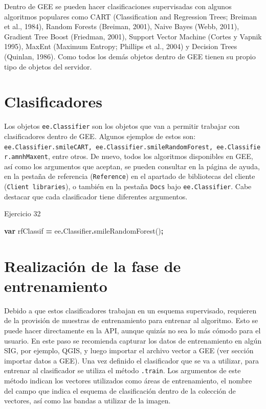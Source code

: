 \documentclass[
  12pt,
  letterpaper,
  twoside]{book}
\newenvironment{Shaded}{\begin{snugshade}}{\end{snugshade}}
\newcommand{\AttributeTok}[1]{\textcolor[rgb]{0.77,0.63,0.00}{#1}}
\newcommand{\FunctionTok}[1]{\textcolor[rgb]{0.00,0.00,0.00}{#1}}
\newcommand{\KeywordTok}[1]{\textcolor[rgb]{0.13,0.29,0.53}{\textbf{#1}}}
\newcommand{\NormalTok}[1]{#1}
\newcommand{\OperatorTok}[1]{\textcolor[rgb]{0.81,0.36,0.00}{\textbf{#1}}}
\begin{document}
Dentro de GEE se pueden hacer clasificaciones supervisadas con algunos algoritmos populares como CART (Classification and Regression Trees; Breiman et al., 1984), Random Forests (Breiman, 2001), Naive Bayes (Webb, 2011), Gradient Tree Boost (Friedman, 2001), Support Vector Machine (Cortes y Vapnik 1995), MaxEnt (Maximum Entropy; Phillips et al., 2004) y Decision Trees (Quinlan, 1986). Como todos los demás objetos dentro de GEE tienen su propio tipo de objetos del servidor.

\hypertarget{clasificadores}{%
\section{Clasificadores}\label{clasificadores}}

Los objetos \texttt{ee.Classifier} son los objetos que van a permitir trabajar con clasificadores dentro de GEE. Algunos ejemplos de estos son: \texttt{ee.Classifier.smileCART,\ ee.Classifier.smileRandomForest,\ ee.Classifier.amnhMaxent}, entre otros. De nuevo, todos los algoritmos disponibles en GEE, así como los argumentos que aceptan, se pueden consultar en la página de ayuda, en la pestaña de referencia (\texttt{Reference}) en el apartado de bibliotecas del cliente (\texttt{Client\ libraries}), o también en la pestaña \texttt{Docs} bajo \texttt{ee.Classifier}. Cabe destacar que cada clasificador tiene diferentes argumentos.

Ejercicio 32

\begin{Shaded}
\begin{Highlighting}[]
\KeywordTok{var}\NormalTok{ rfClassif }\OperatorTok{=}\NormalTok{ ee}\OperatorTok{.}\AttributeTok{Classifier}\OperatorTok{.}\FunctionTok{smileRandomForest}\NormalTok{()}\OperatorTok{;}
\end{Highlighting}
\end{Shaded}

\hypertarget{realizaciuxf3n-de-la-fase-de-entrenamiento}{%
\section{Realización de la fase de entrenamiento}\label{realizaciuxf3n-de-la-fase-de-entrenamiento}}

Debido a que estos clasificadores trabajan en un esquema supervisado, requieren de la provisión de muestras de entrenamiento para entrenar al algoritmo. Esto se puede hacer directamente en la API, aunque quizás no sea lo más cómodo para el usuario. En este paso se recomienda capturar los datos de entrenamiento en algún SIG, por ejemplo, QGIS, y luego importar el archivo vector a GEE (ver sección importar datos a GEE). Una vez definido el clasificador que se va a utilizar, para entrenar al clasificador se utiliza el método \texttt{.train}. Los argumentos de este método indican los vectores utilizados como áreas de entrenamiento, el nombre del campo que indica el esquema de clasificación dentro de la colección de vectores, así como las bandas a utilizar de la imagen.
\end{document}
